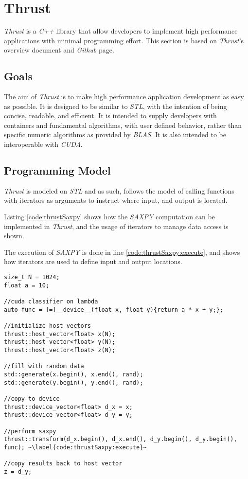 \section{Thrust}
\textit{Thrust} is a \textit{C++} library that allow developers to implement high performance applications with minimal programming effort. This section is based on \textit{Thrust}'s overview document\cite{thrustOverview} and \textit{Github} page\cite{thrustGithub}.

\subsection{Goals}
The aim of \textit{Thrust} is to make high performance application development as easy as possible. It is designed to be similar to \textit{STL}, with the intention of being concise, readable, and efficient. It is intended to supply developers with containers and fundamental algorithms, with user defined behavior, rather than specific numeric algorithms as provided by \textit{BLAS}. It is also intended to be interoperable with \textit{CUDA}.

\subsection{Programming Model}
\textit{Thrust} is modeled on \textit{STL} and as such, follows the model of calling functions with iterators as arguments to instruct where input, and output is located.

Listing \ref{code:thrustSaxpy} shows how the \textit{SAXPY} computation can be implemented in \textit{Thrust}, and the usage of iterators to manage data access is shown.

The execution of \textit{SAXPY} is done in line \ref{code:thrustSaxpy:execute}, and shows how iterators are used to define input and output locations.
\begin{lstlisting}[caption={\textit{Thrust} \textit{SAXPY} example.}, label={code:thrustSaxpy}]
size_t N = 1024;
float a = 10;

//cuda classifier on lambda
auto func = [=]__device__(float x, float y){return a * x + y;};

//initialize host vectors
thrust::host_vector<float> x(N);
thrust::host_vector<float> y(N);
thrust::host_vector<float> z(N);

//fill with random data
std::generate(x.begin(), x.end(), rand);
std::generate(y.begin(), y.end(), rand);

//copy to device
thrust::device_vector<float> d_x = x;
thrust::device_vector<float> d_y = y;

//perform saxpy
thrust::transform(d_x.begin(), d_x.end(), d_y.begin(), d_y.begin(), func); ~\label{code:thrustSaxpy:execute}~

//copy results back to host vector
z = d_y;
\end{lstlisting}

